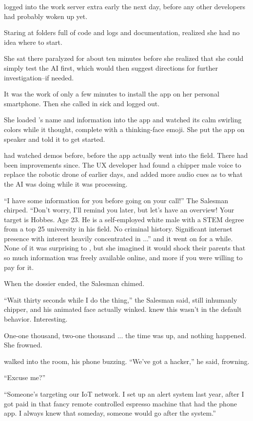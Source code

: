 {\protag} logged into the work server extra early the next day, before any other developers had probably woken up yet.

Staring at folders full of code and logs and documentation, {\protag} realized she had no idea where to start. 

She sat there paralyzed for about ten minutes before she realized that she could simply test the AI first, which would then suggest directions for further investigation--if needed.

It was the work of only a few minutes to install the app on her personal smartphone. Then she called in sick and logged out.

She loaded {\sidetag}'s name and information into the app and watched its calm swirling colors while it thought, complete with a thinking-face emoji. She put the app on speaker and told it to get started.

{\protag} had watched demos before, before the app actually went into the field. There had been improvements since. The UX developer had found a chipper male voice to replace the robotic drone of earlier days, and added more audio cues as to what the AI was doing while it was processing.

``I have some information for you before going on your call!'' The Salesman chirped. ``Don't worry, I'll remind you later, but let's have an overview! Your target is {\sidetag} Hobbes. Age 23. He is a self-employed white male with a STEM degree from a top 25 university in his field. No criminal history. Significant internet presence with interest heavily concentrated in ...'' and it went on for a while. None of it was surprising to {\protag}, but she imagined it would shock their parents that so much information was freely available online, and more if you were willing to pay for it.

When the dossier ended, the Salesman chimed.

``Wait thirty seconds while I do the thing,'' the Salesman said, still inhumanly chipper, and his animated face actually winked. {\protag} knew this wasn't in the default behavior. Interesting.

One-one thousand, two-one thousand ... the time was up, and nothing happened. She frowned. 

{\sidetag} walked into the room, his phone buzzing. ``We’ve got a hacker,'' he said, frowning.

``Excuse me?''

``Someone’s targeting our IoT network. I set up an alert system last year, after I got paid in that fancy remote controlled espresso machine that had the phone app. I always knew that someday, someone would go after the system.''

